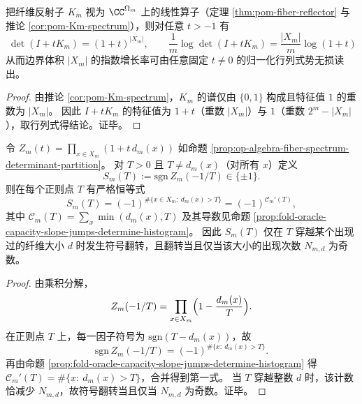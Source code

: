 \begin{corollary}[纤维反射子的行列式势：\texorpdfstring{$\det(I+tK_m)=(1+t)^{|X_m|}$}{det(I+tK)=(1+t)^|X|}]\label{cor:op-algebra-fiber-reflector-determinant-potential}
把纤维反射子 \(K_m\) 视为 \(\CC^{\Omega_m}\) 上的线性算子（定理 \ref{thm:pom-fiber-reflector} 与推论 \ref{cor:pom-Km-spectrum}），则对任意 \(t>-1\) 有
\[
\boxed{\;
\det(I+tK_m)=(1+t)^{|X_m|},\qquad
\frac{1}{m}\log\det(I+tK_m)=\frac{|X_m|}{m}\log(1+t)\;}
\]
从而边界体积 \(|X_m|\) 的指数增长率可由任意固定 \(t\neq 0\) 的归一化行列式势无损读出。
\end{corollary}
\begin{proof}
由推论 \ref{cor:pom-Km-spectrum}，\(K_m\) 的谱仅由 \(\{0,1\}\) 构成且特征值 \(1\) 的重数为 \(|X_m|\)。
因此 \(I+tK_m\) 的特征值为 \(1+t\)（重数 \(|X_m|\)）与 \(1\)（重数 \(2^m-|X_m|\)），取行列式得结论。证毕。
\end{proof}

\begin{proposition}[行列式势的符号翻转与容量斜率奇偶性]\label{prop:op-algebra-fiber-determinant-sign-capacity-parity}
令 \(Z_m(t)=\prod_{x\in X_m}(1+t\,d_m(x))\) 如命题 \ref{prop:op-algebra-fiber-spectrum-determinant-partition}。
对 \(T>0\) 且 \(T\neq d_m(x)\)（对所有 \(x\)）定义
\[
S_m(T):=\mathrm{sgn}\,Z_m(-1/T)\in\{\pm 1\}.
\]
则在每个正则点 \(T\) 有严格恒等式
\[
\boxed{\;
S_m(T)=(-1)^{\#\{x\in X_m:\ d_m(x)>T\}}
=(-1)^{\mathcal{C}_m'(T)},\;}
\]
其中 \(\mathcal{C}_m(T)=\sum_x\min(d_m(x),T)\) 及其导数见命题 \ref{prop:fold-oracle-capacity-slope-jumps-determine-histogram}。
因此 \(S_m(T)\) 仅在 \(T\) 穿越某个出现过的纤维大小 \(d\) 时发生符号翻转，且翻转当且仅当该大小的出现次数 \(N_{m,d}\) 为奇数。
\end{proposition}
\begin{proof}
由乘积分解，
\[
Z_m(-1/T)=\prod_{x\in X_m}\Bigl(1-\frac{d_m(x)}{T}\Bigr).
\]
在正则点 \(T\) 上，每一因子符号为 \(\mathrm{sgn}(T-d_m(x))\)，故
\[
\mathrm{sgn}\,Z_m(-1/T)=(-1)^{\#\{x:\ d_m(x)>T\}}.
\]
再由命题 \ref{prop:fold-oracle-capacity-slope-jumps-determine-histogram} 得 \(\mathcal{C}_m'(T)=\#\{x:\ d_m(x)>T\}\)，合并得到第一式。
当 \(T\) 穿越整数 \(d\) 时，该计数恰减少 \(N_{m,d}\)，故符号翻转当且仅当 \(N_{m,d}\) 为奇数。证毕。
\end{proof}
